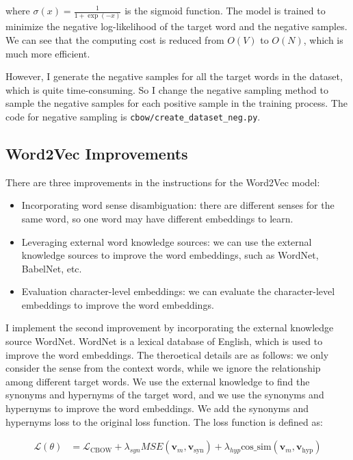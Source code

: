 \documentclass[UTF8,a4paper,12pt]{article}
\newcommand{\V}[1]{\bm{#1}} %
\begin{document}
where $\sigma(x) = \frac{1}{1+\exp(-x)}$ is the sigmoid function. The model is trained to minimize the negative log-likelihood of the target word and the negative samples. We can see that the computing cost is reduced from $O(V)$ to $O(N)$, which is much more efficient.

However, I generate the negative samples for all the target words in the dataset, which is quite time-consuming. So I change the negative sampling method to sample the negative samples for each positive sample in the training process. The code for negative sampling is \texttt{cbow/create\_dataset\_neg.py}.

\subsection{Word2Vec Improvements}

There are three improvements in the instructions for the Word2Vec model:

\begin{itemize}
    \item Incorporating word sense disambiguation: there are different senses for the same word, so one word may have different embeddings to learn. 
    \item Leveraging external word knowledge sources: we can use the external knowledge sources to improve the word embeddings, such as WordNet, BabelNet, etc.
    \item Evaluation character-level embeddings: we can evaluate the character-level embeddings to improve the word embeddings.
\end{itemize}

I implement the second improvement by incorporating the external knowledge source WordNet. WordNet is a lexical database of English, which is used to improve the word embeddings. The theroetical details are as follows: we only consider the sense from the context words, while we ignore the relationship among different target words. We use the external knowledge to find the synonyms and hypernyms of the target word, and we use the synonyms and hypernyms to improve the word embeddings. We add the synonyms and hypernyms loss to the original loss function. The loss function is defined as:

\begin{equation}
    \begin{aligned}
        \mathcal{L}(\theta) &= \mathcal{L}_{\text{CBOW}} + \lambda_{syn} MSE(\V{v}_m, \V{v}_{\text{syn}}) + \lambda_{hyp} \text{cos\_sim}(\V{v}_m, \V{v}_{\text{hyp}})
    \end{aligned}
\end{equation}
\end{document}
